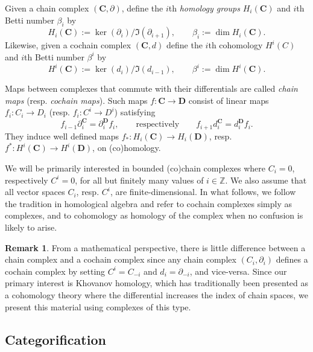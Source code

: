 \documentclass[a4paper,onecolumn,unpublished]{quantumarticle}
\theoremstyle{plain}
\theoremstyle{definition}
\theoremstyle{definition}
\newtheorem{remark}[theorem]{Remark}
\numberwithin{equation}{section}
\newcommand{\maps}{\colon}
\renewcommand{\to}{\rightarrow}
\begin{document}
Given a chain complex $(\mathbf{C}, \partial)$, define the $i$th {\em homology groups} $H_i(\mathbf{C})$ and $i$th Betti number $\beta_i$   by
\[
H_i(\mathbf{C}):= \ker(\partial_i)/ \Im (\partial_{i+1}), \qquad \beta_i := \dim H_i (\mathbf{C}) .
\]
Likewise, given a cochain complex $(\mathbf{C}, d)$ define the $i$th cohomology $H^i(C)$ and $i$th Betti number $\beta^i$   by
\[
H^i(\mathbf{C}):= \ker(d_i)/ \Im (d_{i-1}), \qquad \beta^i := \dim H^i (\mathbf{C}).
\]


Maps between complexes that commute with their differentials are called {\em chain maps} (resp. {\em cochain maps}). Such maps $f:\mathbf C\to\mathbf D$ consist of linear maps $f_i:C_i\to D_i$ (resp. $f_i:C^i\to D^i$) satisfying
\[
 f_{i-1}\partial_i^{\mathbf C}=\partial_i^{\mathbf D}f_i,
 \qquad\text{respectively}\qquad
 f_{i+1}d_i^{\mathbf C}=d_i^{\mathbf D}f_i.
\]
They induce well defined maps $f_{\ast} \maps H_i(\mathbf{C}) \to H_i(\mathbf{D})$, resp. $f^{\ast} \maps H^i(\mathbf{C}) \to H^i(\mathbf{D})$, on (co)homology.

We will be primarily interested in bounded (co)chain complexes where $C_i =0$, respectively $C^i =0$, for all but finitely many values of $i \in \mathbb{Z}$.   We also assume that all vector spaces $C_i$, resp. $C^i$, are finite-dimensional. 
In what follows, we follow the tradition in homological algebra and refer to cochain complexes simply as complexes, and to cohomology as homology of the complex when no confusion is likely to arise. 

\begin{remark}
From a mathematical perspective, there is little difference between a chain complex and a cochain complex since any chain complex $(C_i, \partial_i)$ defines a cochain complex by setting $C^{i}= C_{-i}$ and $d_i = \partial_{-i}$, and vice-versa. Since our primary interest is Khovanov homology, which has traditionally been presented as a cohomology theory where the differential increases the index of chain spaces, we present this material using complexes of this type.   
\end{remark}


 


\subsection{Categorification} \label{subsec:Categorification}
\end{document}
